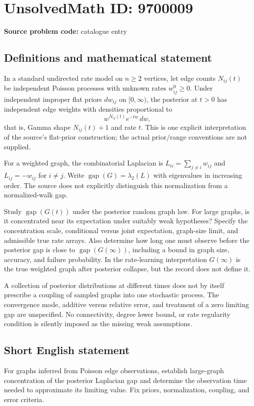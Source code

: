 \documentclass[11pt]{article}
\begin{document}
\section*{UnsolvedMath ID: 9700009}
\textbf{Source problem code:} catalogue entry
\subsection{Definitions and mathematical statement}
In a standard undirected rate model on $n\geq2$ vertices, let edge counts $N_{ij}(t)$ be independent Poisson processes with unknown rates $w^0_{ij}\geq0$. Under independent improper flat priors $dw_{ij}$ on $[0,\infty)$, the posterior at $t>0$ has independent edge weights with densities proportional to
\[
w^{N_{ij}(t)}e^{-tw}\,dw,
\]
that is, Gamma shape $N_{ij}(t)+1$ and rate $t$. This is one explicit interpretation of the source's flat-prior construction; the actual prior/range conventions are not supplied.

For a weighted graph, the combinatorial Laplacian is $L_{ii}=\sum_{j\ne i}w_{ij}$ and $L_{ij}=-w_{ij}$ for $i\ne j$. Write $\operatorname{gap}(G)=\lambda_2(L)$ with eigenvalues in increasing order. The source does not explicitly distinguish this normalization from a normalized-walk gap.

Study $\operatorname{gap}(G(t))$ under the posterior random graph law. For large graphs, is it concentrated near its expectation under suitably weak hypotheses? Specify the concentration scale, conditional versus joint expectation, graph-size limit, and admissible true rate arrays. Also determine how long one must observe before the posterior gap is close to $\operatorname{gap}(G(\infty))$, including a bound in graph size, accuracy, and failure probability. In the rate-learning interpretation $G(\infty)$ is the true weighted graph after posterior collapse, but the record does not define it.

A collection of posterior distributions at different times does not by itself prescribe a coupling of sampled graphs into one stochastic process. The convergence mode, additive versus relative error, and treatment of a zero limiting gap are unspecified. No connectivity, degree lower bound, or rate regularity condition is silently imposed as the missing weak assumptions.
\subsection{Short English statement}
For graphs inferred from Poisson edge observations, establish large-graph concentration of the posterior Laplacian gap and determine the observation time needed to approximate its limiting value. Fix priors, normalization, coupling, and error criteria.
\end{document}
